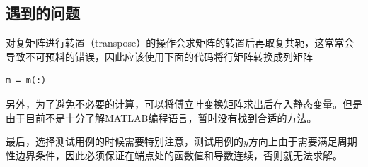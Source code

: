 \documentclass[paper=a4, fontsize=11pt]{scrartcl} %
\numberwithin{equation}{section} %
\numberwithin{figure}{section} %
\numberwithin{table}{section} %
\begin{document}
\begin{CJK*}{UTF8}{gbsn}
\subsection{遇到的问题}
对复矩阵进行转置（transpose）的操作会求矩阵的转置后再取复共轭，这常常会导致不可预料的错误，因此应该使用下面的代码将行矩阵转换成列矩阵
\lstset{language=MATLAB}
\begin{lstlisting}
m = m(:)
\end{lstlisting}
另外，为了避免不必要的计算，可以将傅立叶变换矩阵求出后存入静态变量。但是由于目前不是十分了解MATLAB编程语言，暂时没有找到合适的方法。

最后，选择测试用例的时候需要特别注意，测试用例的$y$方向上由于需要满足周期性边界条件，因此必须保证在端点处的函数值和导数连续，否则就无法求解。
\end{CJK*}
\end{document}

